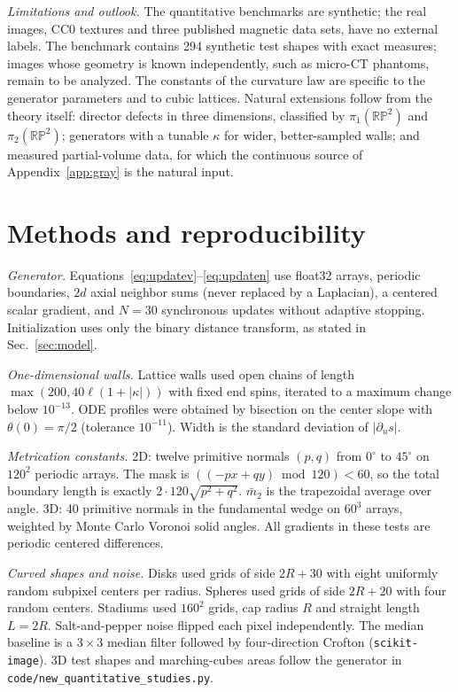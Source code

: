\documentclass[11pt,a4paper]{article}
\newcommand{\RP}{\mathbb{RP}}
\begin{document}
\emph{Limitations and outlook.} The quantitative benchmarks are synthetic; the real images, CC0 textures and three published magnetic data sets, have no external labels. The benchmark contains 294 synthetic test shapes with exact measures; images whose geometry is known independently, such as micro-CT phantoms, remain to be analyzed. The constants of the curvature law are specific to the generator parameters and to cubic lattices. Natural extensions follow from the theory itself: director defects in three dimensions, classified by $\pi_1(\RP^2)$ and $\pi_2(\RP^2)$; generators with a tunable $\kappa$ for wider, better-sampled walls; and measured partial-volume data, for which the continuous source of Appendix~\ref{app:gray} is the natural input.

\section{Methods and reproducibility}\label{sec:methods}
\emph{Generator.} Equations~\eqref{eq:updatev}--\eqref{eq:updaten} use float32 arrays, periodic boundaries, $2d$ axial neighbor sums (never replaced by a Laplacian), a centered scalar gradient, and $N=30$ synchronous updates without adaptive stopping. Initialization uses only the binary distance transform, as stated in Sec.~\ref{sec:model}.

\emph{One-dimensional walls.} Lattice walls used open chains of length $\max(200,40\ell(1+|\kappa|))$ with fixed end spins, iterated to a maximum change below $10^{-13}$. ODE profiles were obtained by bisection on the center slope with $\theta(0)=\pi/2$ (tolerance $10^{-11}$). Width is the standard deviation of $|\partial_us|$.

\emph{Metrication constants.} 2D: twelve primitive normals $(p,q)$ from $0^\circ$ to $45^\circ$ on $120^2$ periodic arrays. The mask is $((-px+qy)\bmod 120)<60$, so the total boundary length is exactly $2\cdot120\sqrt{p^2+q^2}$. $\bar m_2$ is the trapezoidal average over angle. 3D: 40 primitive normals in the fundamental wedge on $60^3$ arrays, weighted by Monte Carlo Voronoi solid angles. All gradients in these tests are periodic centered differences.

\emph{Curved shapes and noise.} Disks used grids of side $2R+30$ with eight uniformly random subpixel centers per radius. Spheres used grids of side $2R+20$ with four random centers. Stadiums used $160^2$ grids, cap radius $R$ and straight length $L=2R$. Salt-and-pepper noise flipped each pixel independently. The median baseline is a $3\times3$ median filter followed by four-direction Crofton (\texttt{scikit-image}). 3D test shapes and marching-cubes areas follow the generator in \texttt{code/new\_quantitative\_studies.py}.
\end{document}

